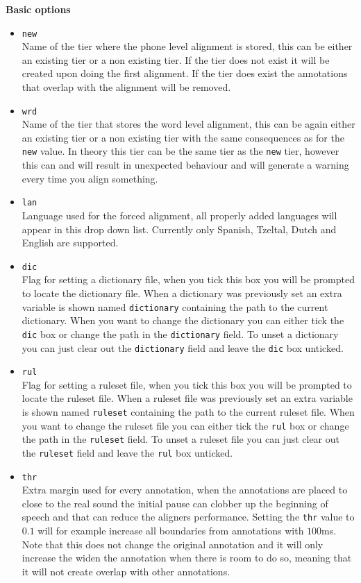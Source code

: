 \begin{itemize}
		\textbf{Basic options}	
		\begin{itemize}
			\item \texttt{new}\\
				Name of the tier where the phone level alignment is stored, this can be
				either an existing tier or a non existing tier. If the tier does not
				exist it will be created upon doing the first alignment. If the tier
				does exist the annotations that overlap with the alignment will be
				removed.
			\item \texttt{wrd}\\
				Name of the tier that stores the word level alignment, this can be
				again either an existing tier or a non existing tier with the same
				consequences as for the \texttt{new} value. In theory this tier can be
				the same tier as the \texttt{new} tier, however this can and will
				result in unexpected behaviour and will generate a warning every time
				you align something.
			\item \texttt{lan}\\
				Language used for the forced alignment, all properly added languages
				will appear in this drop down list. Currently only Spanish, Tzeltal,
				Dutch and English are supported.
			\item \texttt{dic}\\
				Flag for setting a dictionary file, when you tick this box you
				will be prompted to locate the dictionary file. When a dictionary was
				previously set an extra variable is shown named \texttt{dictionary}
				containing the path to the current dictionary. When you want to change
				the dictionary you can either tick the \texttt{dic} box or change the
				path in the \texttt{dictionary} field. To unset a dictionary you can
				just clear out the \texttt{dictionary} field and leave the \texttt{dic}
				box unticked.
			\item \texttt{rul}\\
				Flag for setting a ruleset file, when you tick this box you will be
				prompted to locate the ruleset file. When a ruleset file was
				previously set an extra variable is shown named \texttt{ruleset}
				containing the path to the current ruleset file. When you want to
				change the ruleset file you can either tick the \texttt{rul} box or
				change the path in the \texttt{ruleset} field. To unset a ruleset file
				you can just clear out the \texttt{ruleset} field and leave the
				\texttt{rul} box unticked.
			\item \texttt{thr}\\
				Extra margin used for every annotation, when the annotations are placed
				to close to the real sound the initial pause can clobber up the
				beginning of speech and that can reduce the aligners performance.
				Setting the \texttt{thr} value to $0.1$ will for example increase all
				boundaries from annotations with $100$ms. Note that this does not
				change the original annotation and it will only increase the widen the
				annotation when there is room to do so, meaning that it will not create
				overlap with other annotations.
		\end{itemize}


\end{itemize}
